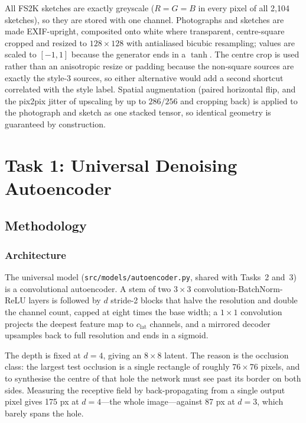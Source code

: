 \documentclass[conference]{IEEEtran}
\begin{document}
All FS2K sketches are exactly greyscale ($R = G = B$ in every pixel of all
2{,}104 sketches), so they are stored with one channel. Photographs and sketches
are made EXIF-upright, composited onto white where transparent, centre-square
cropped and resized to $128 \times 128$ with antialiased bicubic resampling;
values are scaled to $[-1,1]$ because the generator ends in a $\tanh$. The centre
crop is used rather than an anisotropic resize or padding because the
non-square sources are exactly the style-3 sources, so either alternative would
add a second shortcut correlated with the style label. Spatial augmentation
(paired horizontal flip, and the pix2pix jitter of upscaling by up to
$286/256$ and cropping back) is applied to the photograph and sketch as one
stacked tensor, so identical geometry is guaranteed by construction.

\section{Task 1: Universal Denoising Autoencoder}
\label{sec:task1}

\subsection{Methodology}

\subsubsection{Architecture}

The universal model (\texttt{src/models/autoencoder.py}, shared with Tasks~2
and~3) is a convolutional autoencoder. A stem of two $3\times3$
convolution-BatchNorm-ReLU layers is followed by $d$ stride-2 blocks that halve
the resolution and double the channel count, capped at eight times the base
width; a $1\times1$ convolution projects the deepest feature map to
$c_\text{lat}$ channels, and a mirrored decoder upsamples back to full
resolution and ends in a sigmoid.

The depth is fixed at $d = 4$, giving an $8 \times 8$ latent. The reason is the
occlusion class: the largest test occlusion is a single rectangle of roughly
$76 \times 76$ pixels, and to synthesise the centre of that hole the network must
see past its border on both sides. Measuring the receptive field by
back-propagating from a single output pixel gives 175 px at $d = 4$---the whole
image---against 87 px at $d = 3$, which barely spans the hole.
\end{document}
